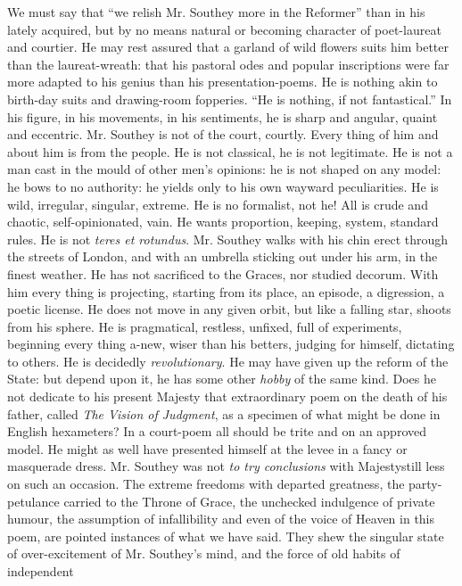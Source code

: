 We must say that ``we relish Mr. Southey more in the Reformer''
than in his lately acquired, but by no means natural or becoming
character of poet-laureat and courtier. He may rest assured that a
garland of wild flowers suits him better than the laureat-wreath:
that his pastoral odes and popular inscriptions were far more
adapted to his genius than his presentation-poems. He is nothing
akin to birth-day suits and drawing-room fopperies. ``He is
nothing, if not fantastical.'' In his figure, in his movements, in
his sentiments, he is sharp and angular, quaint and
eccentric. Mr. Southey is not of the court, courtly. Every thing
of him and about him is from the people. He is not classical, he
is not legitimate. He is not a man cast in the mould of other
men's opinions: he is not shaped on any model: he bows to no
authority: he yields only to his own wayward peculiarities. He is
wild, irregular, singular, extreme. He is no formalist, not he!
All is crude and chaotic, self-opinionated, vain. He wants
proportion, keeping, system, standard rules. He is not \emph{teres
  et rotundus}. Mr. Southey walks with his chin erect through the
streets of London, and with an umbrella sticking out under his
arm, in the finest weather. He has not sacrificed to the Graces,
nor studied decorum. With him every thing is projecting, starting
from its place, an episode, a digression, a poetic license. He
does not move in any given orbit, but like a falling star, shoots
from his sphere. He is pragmatical, restless, unfixed, full of
experiments, beginning every thing a-new, wiser than his betters,
judging for himself, dictating to others. He is decidedly
\emph{revolutionary}. He may have given up the reform of the
State: but depend upon it, he has some other \emph{hobby} of the
same kind. Does he not dedicate to his present Majesty that
extraordinary poem on the death of his father, called \emph{The
  Vision of Judgment}, as a specimen of what might be done in
English hexameters? In a court-poem all should be trite and on an
approved model. He might as well have presented himself at the
levee in a fancy or masquerade dress. Mr. Southey was not \emph{to
  try conclusions} with Majesty\textemdash still less on such an
occasion. The extreme freedoms with departed greatness, the
party-petulance carried to the Throne of Grace, the unchecked
indulgence of private humour, the assumption of infallibility and
even of the voice of Heaven in this poem, are pointed instances of
what we have said. They shew the singular state of over-excitement
of Mr. Southey's mind, and the force of old habits of independent
